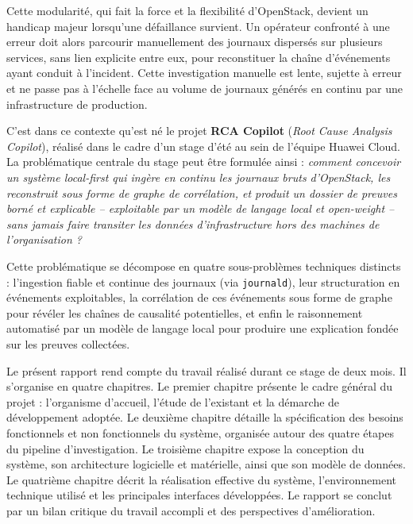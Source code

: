 \documentclass[a4paper,11pt,oneside]{report}
\begin{document}
Cette modularité, qui fait la force et la flexibilité d'OpenStack, devient un handicap majeur lorsqu'une défaillance survient. Un opérateur confronté à une erreur doit alors parcourir manuellement des journaux dispersés sur plusieurs services, sans lien explicite entre eux, pour reconstituer la chaîne d'événements ayant conduit à l'incident. Cette investigation manuelle est lente, sujette à erreur et ne passe pas à l'échelle face au volume de journaux générés en continu par une infrastructure de production.

C'est dans ce contexte qu'est né le projet \textbf{RCA Copilot} (\emph{Root Cause Analysis Copilot}), réalisé dans le cadre d'un stage d'été au sein de l'équipe Huawei Cloud. La problématique centrale du stage peut être formulée ainsi : \emph{comment concevoir un système local-first qui ingère en continu les journaux bruts d'OpenStack, les reconstruit sous forme de graphe de corrélation, et produit un dossier de preuves borné et explicable -- exploitable par un modèle de langage local et open-weight -- sans jamais faire transiter les données d'infrastructure hors des machines de l'organisation ?}

Cette problématique se décompose en quatre sous-problèmes techniques distincts : l'ingestion fiable et continue des journaux (via \texttt{journald}), leur structuration en événements exploitables, la corrélation de ces événements sous forme de graphe pour révéler les chaînes de causalité potentielles, et enfin le raisonnement automatisé par un modèle de langage local pour produire une explication fondée sur les preuves collectées.

Le présent rapport rend compte du travail réalisé durant ce stage de deux mois. Il s'organise en quatre chapitres. Le premier chapitre présente le cadre général du projet : l'organisme d'accueil, l'étude de l'existant et la démarche de développement adoptée. Le deuxième chapitre détaille la spécification des besoins fonctionnels et non fonctionnels du système, organisée autour des quatre étapes du pipeline d'investigation. Le troisième chapitre expose la conception du système, son architecture logicielle et matérielle, ainsi que son modèle de données. Le quatrième chapitre décrit la réalisation effective du système, l'environnement technique utilisé et les principales interfaces développées. Le rapport se conclut par un bilan critique du travail accompli et des perspectives d'amélioration.

\end{document}
